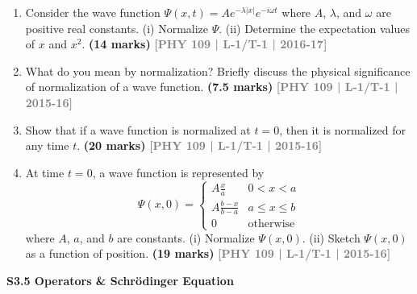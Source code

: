 \documentclass[12pt,a3paper]{article}
\newcommand{\yr}[1]{\hfill\textcolor{gray}{\small\textbf{[#1]}}}
\newcommand{\mk}[1]{\textcolor{orange!70!black}{\small\textbf{(#1 marks)}}}
\newcommand{\subtopic}[2]{%
  \vspace{10pt}
  \noindent\begin{tcolorbox}[colback=#1!8,colframe=#1,boxrule=0.6pt,arc=4pt,
    left=6pt,right=6pt,top=4pt,bottom=4pt]
    \small\bfseries\textcolor{#1}{#2}
  \end{tcolorbox}
  \vspace{2pt}
}
\begin{document}
\begin{enumerate}
\item Consider the wave function $\Psi(x,t) = Ae^{-\lambda|x|}e^{-i\omega t}$ where $A$, $\lambda$, and $\omega$ are positive real constants. (i) Normalize $\Psi$. (ii) Determine the expectation values of $x$ and $x^2$.
\mk{14} \yr{PHY 109 | L-1/T-1 | 2016-17}

\item What do you mean by normalization? Briefly discuss the physical significance of normalization of a wave function.
\mk{7.5} \yr{PHY 109 | L-1/T-1 | 2015-16}

\item Show that if a wave function is normalized at $t = 0$, then it is normalized for any time $t$.
\mk{20} \yr{PHY 109 | L-1/T-1 | 2015-16}

\item At time $t = 0$, a wave function is represented by
\[
  \Psi(x,0) = \begin{cases} A\frac{x}{a} & 0 < x < a \\ A\frac{b-x}{b-a} & a \leq x \leq b \\ 0 & \text{otherwise} \end{cases}
\]
where $A$, $a$, and $b$ are constants. (i) Normalize $\Psi(x,0)$. (ii) Sketch $\Psi(x,0)$ as a function of position.
\mk{19} \yr{PHY 109 | L-1/T-1 | 2015-16}

\end{enumerate}

\label{sec:s35}
\subtopic{cA}{S3.5 \quad Operators \& Schr\"odinger Equation}
\end{document}
